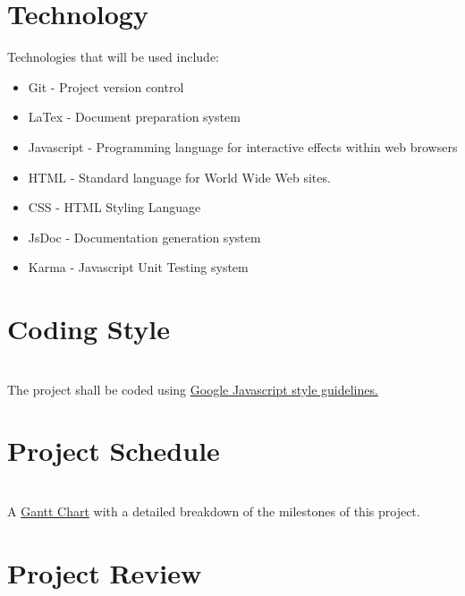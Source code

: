\documentclass{article}
\begin{document}
\section{Technology}
Technologies that will be used include:

\begin{itemize}

  \item Git - Project version control
  \item LaTex - Document preparation system
  \item Javascript - Programming language for interactive effects within web browsers
  \item HTML - Standard language for World Wide Web sites.
  \item CSS - HTML Styling Language 
  \item JsDoc - Documentation generation system
  \item Karma - Javascript Unit Testing system 

\end{itemize}

\section{Coding Style}
 \\
The project shall be coded using \href{https://google.github.io/styleguide/javascriptguide.xml}
{Google Javascript style guidelines.}

\section{Project Schedule}

 \\
A \href{run:../../ProjectSchedule/Gantt Chart.gan}{Gantt Chart} with a detailed breakdown of the milestones of this project.
\section{Project Review}

\newpage
\end{document}
